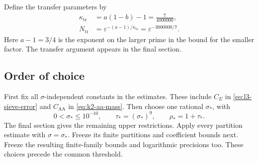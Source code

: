Define the transfer parameters by
\begin{equation}\label{eq:not-transfer-parameters}
\begin{aligned}
 \kappa_{\mathrm{tr}}&=a(1-b)-1=\frac7{4000000},\\
 N_{\mathrm{tr}}&=\varepsilon^{-(a-1)/\kappa_{\mathrm{tr}}}
                 =\varepsilon^{-3000000/7}.
\end{aligned}
\end{equation}
Here $a-1=3/4$ is the exponent on the larger prime in the bound for the
smaller factor.
The transfer argument appears in the final section.

\subsection{Order of choice}

First fix all \(\sigma\)-independent constants in the estimates.
These include \(C_E\) in \eqref{eq:l3-sieve-error}
and \(C_{\mathrm{AA}}\) in \eqref{eq:k2-aa-mass}.
Then choose one rational \(\sigma_*\), with
\begin{equation}\label{eq:not-sigma-choice}
 0<\sigma_*\le10^{-10},\qquad
 \tau_*=(\sigma_*)^9,\qquad \rho_*=1+\tau_*.
\end{equation}
The final section gives the remaining upper restrictions.
Apply every partition estimate with \(\sigma=\sigma_*\).
Freeze its finite partitions and coefficient bounds next.
Freeze the resulting finite-family bounds and logarithmic precisions too.
These choices precede the common threshold.

